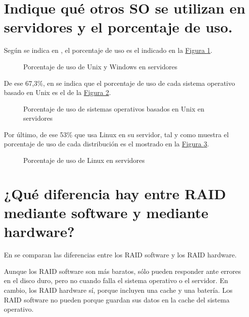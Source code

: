 \documentclass[10pt,a4paper,spanish]{article}
\numberwithin{equation}{section} %
\numberwithin{figure}{section} %
\numberwithin{table}{section} %
\begin{document}
\section{Indique qué otros SO se utilizan en servidores y el porcentaje de uso.}
Según se indica en \cite{osser}, el porcentaje de uso es el indicado en la \hyperref[osser]{Figura \ref*{osser}}.

\begin{figure}[!h]
\centering
{}
\caption{Porcentaje de uso de Unix y Windows en servidores}
\label{osser}
\end{figure}

De ese 67,3\%, en \cite{unixser} se indica que el porcentaje de uso de cada sistema operativo basado en Unix es el de la \hyperref[unixser]{Figura \ref*{unixser}}.

\begin{figure}[!h]
\centering
{}
\caption{Porcentaje de uso de sistemas operativos basados en Unix en servidores}
\label{unixser}
\end{figure}

Por último, de ese 53\% que usa Linux en su servidor, tal y como muestra \cite{linuxser} el porcentaje de uso de cada distribución es el mostrado en la \hyperref[linuxser]{Figura \ref*{linuxser}}.

\begin{figure}[!h]
\centering
{}
\caption{Porcentaje de uso de Linux en servidores}
\label{linuxser}
\end{figure}

\section{¿Qué diferencia hay entre RAID mediante software y mediante hardware?}
En \cite{intelraid} se comparan las diferencias entre los RAID software y los RAID hardware.

Aunque los RAID software son más baratos, sólo pueden responder ante errores en el disco duro, pero no cuando falla el sistema operativo o el servidor. En cambio, los RAID hardware sí, porque incluyen una cache y una batería. Los RAID software no pueden porque guardan sus datos en la cache del sistema operativo.
\end{document}
